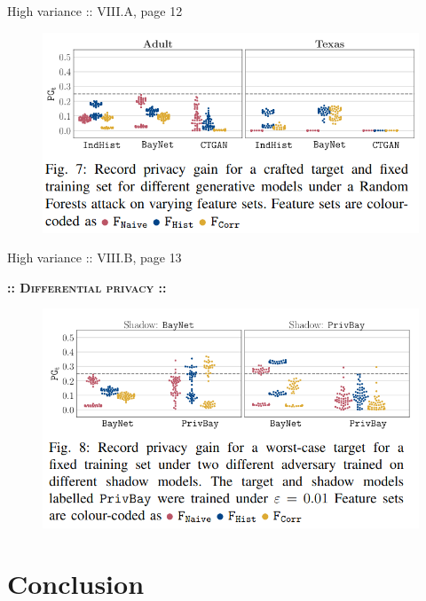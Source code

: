\documentclass[xcolor=dvipsnames,compress]{beamer}
\newcommand{\intertitle}[1]{\vspace{0.1cm}\textbf{:: \textsc{#1} ::}\vspace{0.1cm}}
\newcommand{\centertitle}[1]{\begin{center}\intertitle{#1}\end{center}}
\begin{document}
\begin{frame}{High variance :: VIII.A, page {\small 12}}
	\vspace{1cm}
	\begin{figure}
	\centering
	\includegraphics[scale=0.35]{images/fig7.png}
	\end{figure}
\end{frame}

\begin{frame}{High variance :: VIII.B, page {\small 13}}
	\vspace{1cm}
	\centertitle{Differential privacy}
	\begin{figure}
	\centering
	\includegraphics[scale=0.35]{images/fig8.png}
	\end{figure}
\end{frame}

\section{Conclusion}
\end{document}
